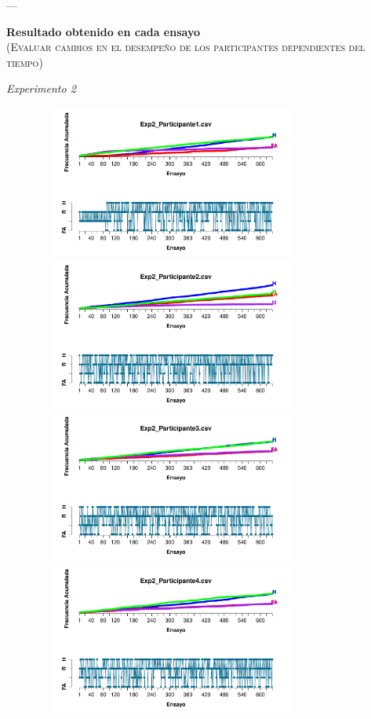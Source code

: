 \documentclass[a4paper ]{article}
\begin{document}
---
\vspace{3mm}
\begin{center}
{\LARGE \textbf{Resultado obtenido en cada ensayo}}\\
{\small \textsc{(Evaluar cambios en el desempeño de los participantes dependientes del tiempo)}}\\
\smallskip
\end{center}
\begin{center}
{\LARGE \textit{Experimento 2}}\\
\end{center}
\vspace{3mm}
\begin{figure}[th]
\centering
\includegraphics[width=9cm, height=5cm]{Figures/Outcome_Exp2_P1} \includegraphics[width=9cm, height=5cm]{Figures/Outcome_Exp2_P2} 
\includegraphics[width=9cm, height=5cm]{Figures/Outcome_Exp2_P3} \includegraphics[width=9cm, height=5cm]{Figures/Outcome_Exp2_P4} 

\end{figure}
\end{document}
